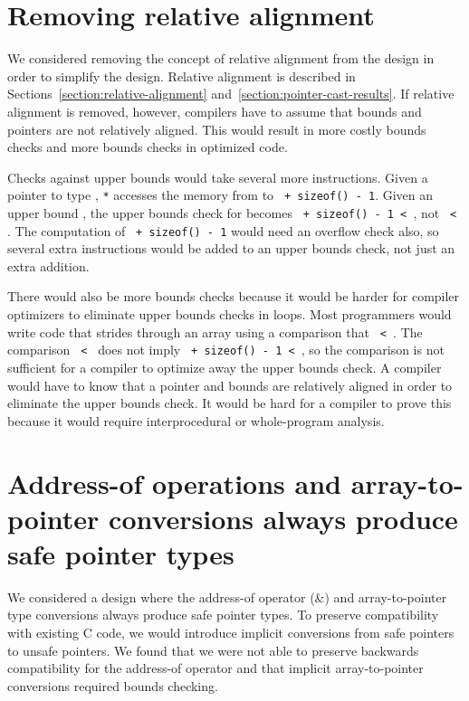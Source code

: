\section{Removing relative alignment}
\label{section:design-alternatives:always-unaligned}

We considered removing the concept of relative alignment from the design in order
to simplify the design. 
Relative alignment is described in Sections~\ref{section:relative-alignment}
and~\ref{section:pointer-cast-results}.  If relative alignment
is removed, however, compilers have to assume that bounds and pointers are
not relatively aligned.   This would result in more costly bounds checks and
more bounds checks in optimized code.

Checks against upper bounds would  take several more instructions.
Given a pointer  to type , \texttt{*} accesses the memory from
 to \texttt{ + sizeof() - 1}. Given an upper bound , the
upper bounds check for  becomes \texttt{ + sizeof() - 1 < },
not \texttt{ < }.  The
computation of \texttt{ + sizeof() - 1} would need an overflow check also, 
so several extra instructions would be added to an upper bounds check, 
not just an extra addition.

There would also be more bounds checks because it would be harder for compiler optimizers
to eliminate upper bounds checks in loops.  Most programmers would write code that
strides through an array using a comparison that
\texttt{ \textless{} }. The comparison 
\texttt{ < } does not imply
\texttt{ + sizeof() - 1 < }, so the comparison is
not sufficient for a compiler to optimize away
the upper bounds check. A compiler would have to know that a pointer
and bounds are relatively aligned in order to eliminate the upper bounds
check. It would be hard for a compiler to prove this because it would
require interprocedural or whole-program analysis.

\section{Address-of operations and array-to-pointer conversions always produce safe pointer types}

We considered a design where the address-of operator (\&) and
array-to-pointer type conversions always produce safe pointer types. To
preserve compatibility with existing C code, we would introduce implicit
conversions from safe pointers to unsafe pointers. We found that we were
not able to preserve backwards compatibility for the address-of operator
and that implicit array-to-pointer conversions required bounds checking.

